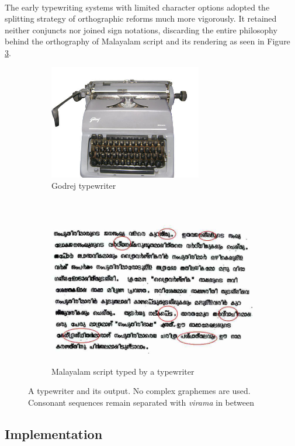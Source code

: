 \documentclass[10pt]{article}
\begin{document}
\paragraph{}
The early typewriting systems with limited character options adopted the splitting strategy of orthographic reforms much more vigorously. It retained neither conjuncts nor joined sign notations, discarding the entire philosophy behind the orthography of Malayalam script and its rendering as seen in Figure \ref{typewriter}.


\begin{figure}[h!]
	\centering
\begin{subfigure}{.7\textwidth}
 \centering
 \includegraphics[width=\linewidth, height=5cm]{images/godrej-typewriter.jpg}
   \caption{Godrej typewriter}
\label{godrej}
\end{subfigure}%
\\
\begin{subfigure}{\textwidth}
 \centering
 \includegraphics[width=\linewidth,height=6.5cm]{images/typewritertext4.jpg}
 \caption{Malayalam script typed by a typewriter}
 \label{typewritertext}
\end{subfigure}
\caption{A typewriter and its output. No complex graphemes are used. Consonant sequences remain separated with \textit{virama} in between}
\label{typewriter}
\end{figure}

\subsection{Implementation}
\end{document}
